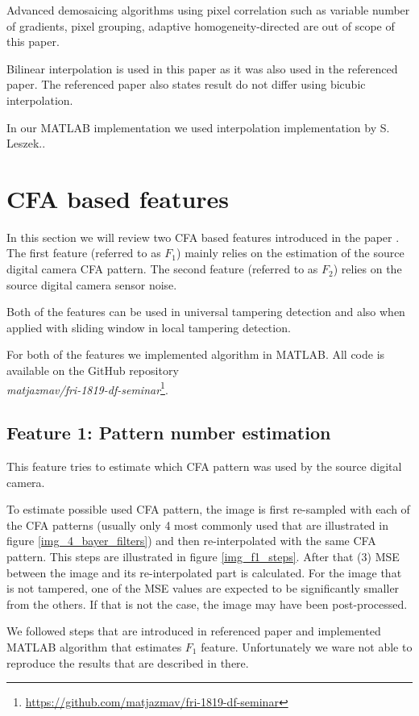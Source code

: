 \documentclass{template/acm_proc_article-sp}
\begin{document}
Advanced demosaicing algorithms using pixel correlation such as 
variable number of gradients, pixel grouping, adaptive homogeneity-directed
are out of scope of this paper.

Bilinear interpolation is used in this paper as it was also used in
the referenced paper. The referenced paper also states result do not
differ using bicubic interpolation.

In our MATLAB implementation we used interpolation implementation by S. Leszek.\cite{cfainterpolation2009}.

\newpage
\section{CFA based features}
In this section we will review two CFA based features introduced in the paper \cite{dirik2009image}. The first feature (referred to as  $F_1$) mainly relies on the estimation of the source digital camera CFA pattern. The second feature (referred to as $F_2$) relies on the source digital camera sensor noise.

Both of the features can be used in universal tampering detection and also when applied with sliding window in local tampering detection.

For both of the features we implemented algorithm in MATLAB. All code is available on the GitHub repository\\\textit{matjazmav/fri-1819-df-seminar}\footnote{\url{https://github.com/matjazmav/fri-1819-df-seminar}}.

\subsection{Feature 1: Pattern number estimation}
This feature tries to estimate which CFA pattern was used by the source digital camera.

To estimate possible used CFA pattern, the image is first re-sampled with each of the CFA patterns (usually only 4 most commonly used that are illustrated in figure \ref{img_4_bayer_filters}) and then re-interpolated with the same CFA pattern. This steps are illustrated in figure \ref{img_f1_steps}. After that (3) MSE between the image and its re-interpolated part is calculated. For the image that is not tampered, one of the MSE values are expected to be significantly smaller from the others. If that is not the case, the image may have been post-processed.

We followed steps that are introduced in referenced paper and implemented MATLAB algorithm that estimates $F_1$ feature. Unfortunately we ware not able to reproduce the results that are described in there.
\end{document}

